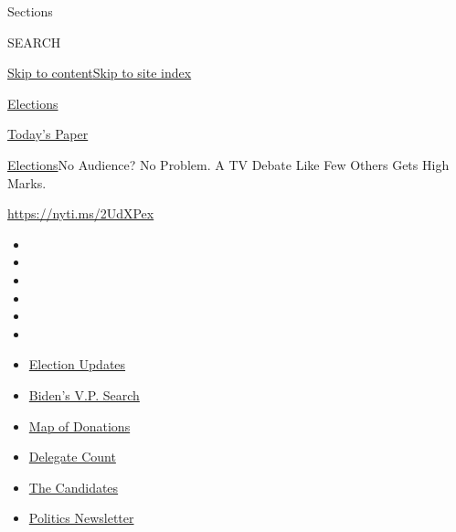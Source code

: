 Sections

SEARCH

\protect\hyperlink{site-content}{Skip to
content}\protect\hyperlink{site-index}{Skip to site index}

\href{https://www.nytimes.com/news-event/2020-election}{Elections}

\href{https://myaccount.nytimes.com/auth/login?response_type=cookie\&client_id=vi}{}

\href{https://www.nytimes.com/section/todayspaper}{Today's Paper}

\href{/news-event/2020-election}{Elections}\textbar{}No Audience? No
Problem. A TV Debate Like Few Others Gets High Marks.

\url{https://nyti.ms/2UdXPex}

\begin{itemize}
\item
\item
\item
\item
\item
\item
\end{itemize}

\begin{itemize}
\item
  \href{https://www.nytimes.com/2020/07/31/us/elections/biden-vs-trump.html?action=click\&pgtype=Article\&state=default\&region=TOP_BANNER\&context=storylines_menu}{Election
  Updates}
\item
  \href{https://www.nytimes.com/article/biden-vice-president-2020.html?action=click\&pgtype=Article\&state=default\&region=TOP_BANNER\&context=storylines_menu}{Biden's
  V.P. Search}
\item
  \href{https://www.nytimes.com/interactive/2020/07/24/us/politics/trump-biden-campaign-donors.html?action=click\&pgtype=Article\&state=default\&region=TOP_BANNER\&context=storylines_menu}{Map
  of Donations}
\item
  \href{https://www.nytimes.com/interactive/2020/us/elections/delegate-count-primary-results.html?action=click\&pgtype=Article\&state=default\&region=TOP_BANNER\&context=storylines_menu}{Delegate
  Count}
\item
  \href{https://www.nytimes.com/interactive/2019/us/politics/2020-presidential-candidates.html?action=click\&pgtype=Article\&state=default\&region=TOP_BANNER\&context=storylines_menu}{The
  Candidates}
\item
  \href{https://www.nytimes.com/newsletters/politics?action=click\&pgtype=Article\&state=default\&region=TOP_BANNER\&context=storylines_menu}{Politics
  Newsletter}
\end{itemize}

